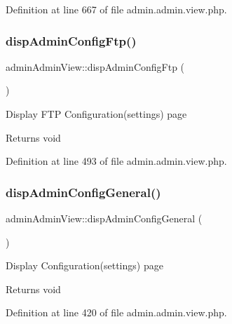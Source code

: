 Definition at line 667 of file admin.\+admin.\+view.\+php.

\mbox{\label{classadminAdminView_ac1d596c739213d4fd3f127a6ca18c155}} 
\subsubsection{\texorpdfstring{disp\+Admin\+Config\+Ftp()}{dispAdminConfigFtp()}}
{\footnotesize\ttfamily admin\+Admin\+View\+::disp\+Admin\+Config\+Ftp (\begin{DoxyParamCaption}{ }\end{DoxyParamCaption})}

Display F\+TP Configuration(settings) page \begin{DoxyReturn}{Returns}
void 
\end{DoxyReturn}


Definition at line 493 of file admin.\+admin.\+view.\+php.

\mbox{\label{classadminAdminView_accaee16084bc6def9e841518d227be0e}} 
\subsubsection{\texorpdfstring{disp\+Admin\+Config\+General()}{dispAdminConfigGeneral()}}
{\footnotesize\ttfamily admin\+Admin\+View\+::disp\+Admin\+Config\+General (\begin{DoxyParamCaption}{ }\end{DoxyParamCaption})}

Display Configuration(settings) page \begin{DoxyReturn}{Returns}
void 
\end{DoxyReturn}


Definition at line 420 of file admin.\+admin.\+view.\+php.

\mbox{\label{classadminAdminView_aff78cea8f2e5632395dd4888742389b8}} 
